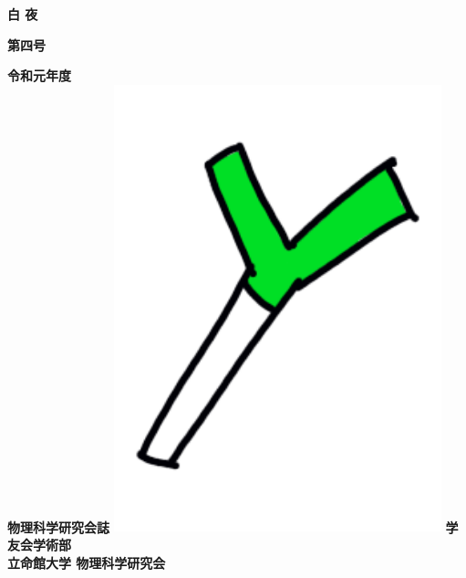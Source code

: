 \documentclass[10pt,b5paper,papersize,dvipdfmx]{jsbook}
\begin{document}
\thispagestyle{empty}

\begin{center}
  {\fontsize{90}{0}\selectfont \bfseries 白 夜}
%
  \begin{flushright}
    \vspace{-6zw}
    {\fontsize{18}{0}\selectfont \bfseries 第四号\hspace{.5zw}\vspace{-1zw}}
    \vspace{6zw}
  \end{flushright}
%
  \vspace{-1zw}
  {\fontsize{13}{0}\selectfont \bfseries 令和元年度 \\ 物理科学研究会誌}
%
  \vfill
  \includegraphics[width=9.5cm]{img/negi.png}
  \vfill
  {\fontsize{13}{0}\selectfont \bfseries 学友会学術部}\\
  \vspace{0.2zw}
  {\fontsize{13}{0}\selectfont \bfseries 立命館大学 物理科学研究会}
\end{center}
\end{document}
